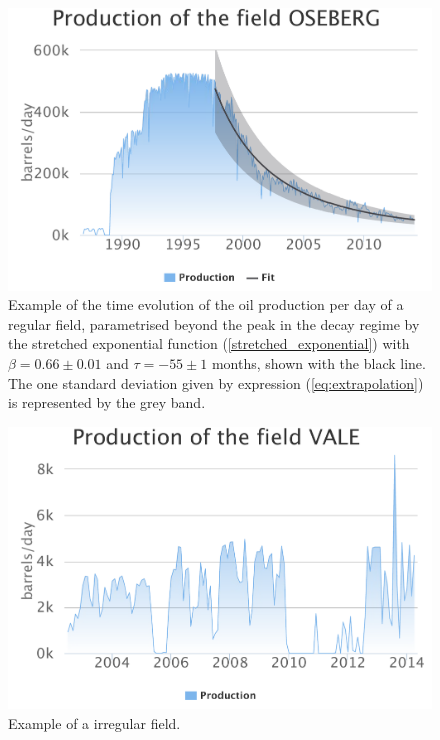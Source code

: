 \documentclass[review]{elsarticle}
\begin{document}
\noindent 
\begin{figure}[H]
\includegraphics[width=1\columnwidth]{oseberg}
\caption{Example of the time evolution of the oil production per day of
a regular field, parametrised beyond the peak in the decay
regime by the stretched exponential 
function (\ref{stretched_exponential}) with $\beta=0.66\pm0.01$ and $\tau=-55\pm1$ months,
shown with the black line.  The one standard deviation given by expression
(\ref{eq:extrapolation}) is represented by the grey band.}
\label{regular} 
\end{figure}


\noindent 
\begin{figure}[H]
\includegraphics[width=1\columnwidth]{vale}
\caption{Example of a irregular field.}
\label{irregular} 
\end{figure}

\pagebreak
\end{document}
